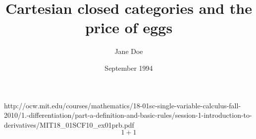 \documentclass{article}
\title{Cartesian closed categories and the price of eggs}
\author{Jane Doe}
\date{September 1994}
\begin{document}
   \maketitle
http://ocw.mit.edu/courses/mathematics/18-01sc-single-variable-calculus-fall-2010/1.-differentiation/part-a-definition-and-basic-rules/session-1-introduction-to-derivatives/MIT18_01SCF10_ex01prb.pdf
$$
1+1
$$
\end{document}
